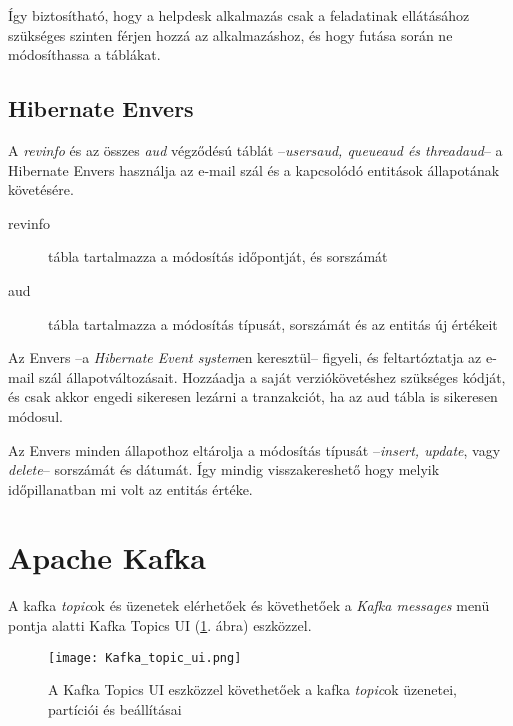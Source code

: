 Így biztosítható, hogy a helpdesk alkalmazás csak a feladatinak ellátásához szükséges szinten férjen hozzá az alkalmazáshoz, és hogy futása során ne módosíthassa a táblákat. 


\subsection{Hibernate Envers}
A \textit{revinfo} és az összes \textit{\textunderscore aud} végződésú táblát --\textit{\mbox{users\textunderscore aud}, \mbox{queue\textunderscore aud} és \mbox{thread\textunderscore aud}}-- a Hibernate Envers használja az e-mail szál és a kapcsolódó entitások állapotának követésére.

\begin{description}
	\item[revinfo] tábla tartalmazza a módosítás időpontját, és sorszámát
	
	\item[\textunderscore aud] tábla tartalmazza a módosítás típusát, sorszámát és az entitás új értékeit
\end{description}

Az Envers --a \textit{Hibernate Event system}en keresztül-- figyeli, és feltartóztatja az e-mail szál állapotváltozásait. Hozzáadja a saját verziókövetéshez szükséges kódját, és csak akkor engedi sikeresen lezárni a tranzakciót, ha az \textunderscore aud tábla is sikeresen módosul.

Az Envers minden állapothoz eltárolja a módosítás típusát --\textit{insert, update}, vagy \textit{delete}-- sorszámát és dátumát. Így mindig visszakereshető hogy melyik időpillanatban mi volt az entitás értéke.



\section{Apache Kafka}\label{sec:kafka_topics}
A kafka \textit{topic}ok és üzenetek elérhetőek és követhetőek a \textit{Kafka messages} menü pontja alatti Kafka Topics UI (\ref{fig:Kafka_Topics_UI}. ábra) eszközzel.

\begin{figure}[hbt] 
	\centering
	\texttt{[image: Kafka\_topic\_ui.png]}
	\caption{A Kafka Topics UI eszközzel követhetőek a kafka \textit{topic}ok üzenetei, partíciói és beállításai}
	\label{fig:Kafka_Topics_UI}
\end{figure}


